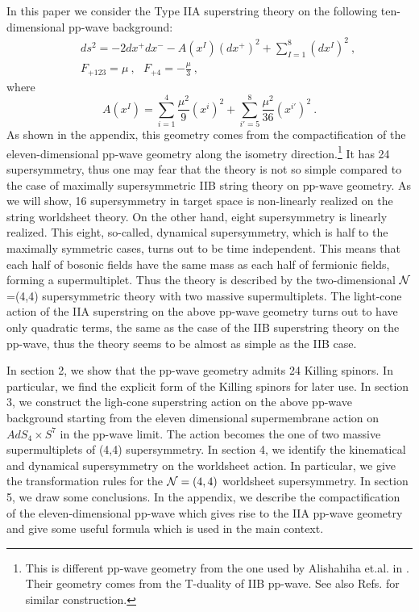 \documentclass[a4paper,12pt]{article}
\begin{document}
In this paper we consider the Type IIA superstring theory on the
following ten-dimensional pp-wave background:
\begin{eqnarray}
& & ds^2 = - 2 dx^+ dx^-
    - A(x^I) (dx^+)^2  + \sum^8_{I=1} (dx^I)^2~,
                                      \nonumber \\
& & F_{+123} = \mu~,\ \ \  F_{+4} = -\frac{\mu}{3}~,
\label{pp-wave}
\end{eqnarray}
where
\begin{equation}
A(x^I) = \sum^4_{i=1} \frac{\mu^2}{9} (x^i)^2
            +\sum^8_{i'=5} \frac{\mu^2}{36} (x^{i'})^2~.
\end{equation}
As shown in the appendix, this geometry comes from the
compactification of the eleven-dimensional pp-wave geometry along the
isometry direction\cite{mic140}.\footnote{This is different pp-wave
  geometry from the one used by Alishahiha et.al. in \cite{ali037}.
  Their geometry comes from the T-duality of IIB pp-wave.  See also
  Refs. \cite{ben195,mic204} for similar construction.}  It has 24
supersymmetry, thus one may fear that the theory is not so simple
compared to the case of maximally supersymmetric IIB string theory on
pp-wave geometry.  As we will show, 16 supersymmetry in target space
is non-linearly realized on the string worldsheet theory. On the other
hand, eight supersymmetry is linearly realized.  This eight,
so-called, dynamical supersymmetry, which is half to the maximally
symmetric cases, turns out to be time independent. This means that
each half of bosonic fields have the same mass as each half of
fermionic fields, forming a supermultiplet.  Thus the theory is
described by the two-dimensional ${\cal N}$=(4,4) supersymmetric
theory with two massive supermultiplets.  The light-cone action of the
IIA superstring on the above pp-wave geometry turns out to have only
quadratic terms, the same as the case of the IIB superstring theory on
the pp-wave, thus the theory seems to be almost as simple as the IIB
case.

In section 2, we show that the pp-wave geometry admits 24 Killing
spinors.  In particular, we find the explicit form of the Killing
spinors for later use.  In section 3, we construct the ligh-cone
superstring action on the above pp-wave background starting from the
eleven dimensional supermembrane action on $AdS_4 \times S^7$ in the
pp-wave limit.  The action becomes the one of two massive
supermultiplets of (4,4) supersymmetry.  In section 4, we identify the
kinematical and dynamical supersymmetry on the worldsheet action.  In
particular, we give the transformation rules for the ${\cal N}= (4,4)$
worldsheet supersymmetry.  In section 5, we draw some conclusions. In
the appendix, we describe the compactification of the
eleven-dimensional pp-wave which gives rise to the IIA pp-wave
geometry and give some useful formula which is used in the main
context.
 
\end{document}
